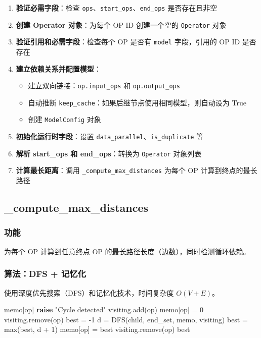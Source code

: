 \documentclass[12pt,a4paper]{article}
\begin{document}
\begin{enumerate}
    \item \textbf{验证必需字段}：检查 \texttt{ops}、\texttt{start\_ops}、\texttt{end\_ops} 是否存在且非空
    \item \textbf{创建 Operator 对象}：为每个 OP ID 创建一个空的 \texttt{Operator} 对象
    \item \textbf{验证引用和必需字段}：检查每个 OP 是否有 \texttt{model} 字段，引用的 OP ID 是否存在
    \item \textbf{建立依赖关系并配置模型}：
    \begin{itemize}
        \item 建立双向链接：\texttt{op.input\_ops} 和 \texttt{op.output\_ops}
        \item 自动推断 \texttt{keep\_cache}：如果后继节点使用相同模型，则自动设为 True
        \item 创建 \texttt{ModelConfig} 对象
    \end{itemize}
    \item \textbf{初始化运行时字段}：设置 \texttt{data\_parallel}、\texttt{is\_duplicate} 等
    \item \textbf{解析 start\_ops 和 end\_ops}：转换为 \texttt{Operator} 对象列表
    \item \textbf{计算最长距离}：调用 \texttt{\_compute\_max\_distances} 为每个 OP 计算到终点的最长路径
\end{enumerate}

\subsection{\_compute\_max\_distances}

\subsubsection{功能}

为每个 OP 计算到任意终点 OP 的最长路径长度（边数），同时检测循环依赖。

\subsubsection{算法：DFS + 记忆化}

使用深度优先搜索（DFS）和记忆化技术，时间复杂度 $O(V + E)$。

\begin{algorithm}
\caption{计算最长距离到终点}
\begin{algorithmic}[1]
        \State \Return memo[op]
    \EndIf
        \State \textbf{raise} "Cycle detected"
    \EndIf
    \State visiting.add(op)
        \State memo[op] = 0
        \State visiting.remove(op)
        \State {}
    \EndIf
    \State best = -1
        \State d = DFS(child, end\_set, memo, visiting)
            \State best = max(best, d + 1)
        \EndIf
    \EndFor
    \State memo[op] = best
    \State visiting.remove(op)
    \State \Return best
\EndProcedure
\end{algorithmic}
\end{algorithm}
\end{document}
